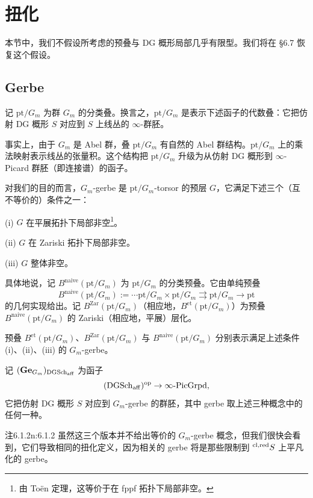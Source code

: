 \chapter{扭化}

本节中，我们不假设所考虑的预叠与 DG 概形局部几乎有限型。我们将在 §6.7 恢复这个假设。

\section{Gerbe}

记 $\mathrm{pt}/G_m$ 为群 $G_m$ 的分类叠。换言之，$\mathrm{pt}/G_m$ 是表示下述函子的代数叠：它把仿射 DG 概形 $S$ 对应到 $S$ 上线丛的 $\infty$-群胚。

事实上，由于 $G_m$ 是 Abel 群，叠 $\mathrm{pt}/G_m$ 有自然的 Abel 群结构。$\mathrm{pt}/G_m$ 上的乘法映射表示线丛的张量积。这个结构把 $\mathrm{pt}/G_m$ 升级为从仿射 DG 概形到 $\infty$-Picard 群胚（即连接谱）的函子。

对我们的目的而言，$G_m$-gerbe 是 $\mathrm{pt}/G_m$-torsor 的预层 $G$，它满足下述三个（互不等价的）条件之一：

(i) $G$ 在平展拓扑下局部非空\footnote{由 Toën 定理，这等价于在 fppf 拓扑下局部非空。}。

(ii) $G$ 在 Zariski 拓扑下局部非空。

(iii) $G$ 整体非空。

具体地说，记 $B^{\mathrm{naive}}(\mathrm{pt}/G_m)$ 为 $\mathrm{pt}/G_m$ 的分类预叠。它由单纯预叠
\[
B^{\mathrm{naive}}(\mathrm{pt}/G_m):=\cdots\mathrm{pt}/G_m\times\mathrm{pt}/G_m\rightrightarrows\mathrm{pt}/G_m\to\mathrm{pt}
\]
的几何实现给出。记 $B^{\mathrm{Zar}}(\mathrm{pt}/G_m)$（相应地，$B^{\mathrm{et}}(\mathrm{pt}/G_m)$）为预叠 $B^{\mathrm{naive}}(\mathrm{pt}/G_m)$ 的 Zariski（相应地，平展）层化。

预叠 $B^{\mathrm{et}}(\mathrm{pt}/G_m)$、$B^{\mathrm{Zar}}(\mathrm{pt}/G_m)$ 与 $B^{\mathrm{naive}}(\mathrm{pt}/G_m)$ 分别表示满足上述条件 (i)、(ii)、(iii) 的 $G_m$-gerbe。

记 $(\mathbf{Ge}_{G_m})_{\mathrm{DGSch}_{\mathrm{aff}}}$ 为函子
\[
(\mathrm{DGSch}_{\mathrm{aff}})^{\mathrm{op}}\to\infty\text{-}\mathrm{PicGrpd},
\]
它把仿射 DG 概形 $S$ 对应到 $G_m$-gerbe 的群胚，其中 gerbe 取上述三种概念中的任何一种。

\begin{othm}{注}{6.1.2}{n:6.1.2}
虽然这三个版本并不给出等价的 $G_m$-gerbe 概念，但我们很快会看到，它们导致相同的扭化定义，因为相关的 gerbe 将是那些限制到 $^{\mathrm{cl,red}} S$ 上平凡化的 gerbe。
\end{othm}


